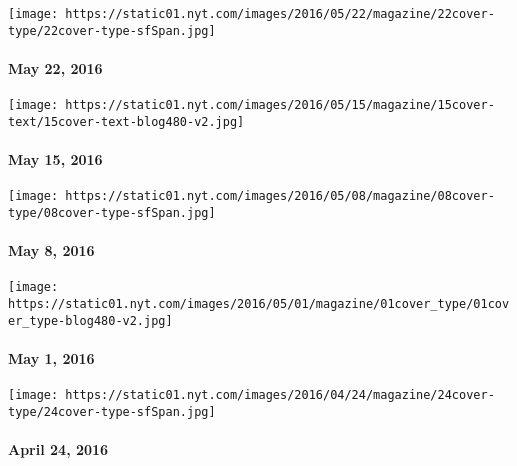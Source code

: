 \href{http://www.nytimes.com/indexes/2016/05/22/magazine/index.html}{}

\texttt{[image: https://static01.nyt.com/images/2016/05/22/magazine/22cover-type/22cover-type-sfSpan.jpg]}

\hypertarget{may-22-2016}{%
\paragraph{May 22, 2016}\label{may-22-2016}}

\href{http://www.nytimes.com/indexes/2016/05/15/magazine/index.html}{}

\texttt{[image: https://static01.nyt.com/images/2016/05/15/magazine/15cover-text/15cover-text-blog480-v2.jpg]}

\hypertarget{may-15-2016}{%
\paragraph{May 15, 2016}\label{may-15-2016}}

\href{http://www.nytimes.com/indexes/2016/05/05/magazine/index.html}{}

\texttt{[image: https://static01.nyt.com/images/2016/05/08/magazine/08cover-type/08cover-type-sfSpan.jpg]}

\hypertarget{may-8-2016}{%
\paragraph{May 8, 2016}\label{may-8-2016}}

\href{http://www.nytimes.com/indexes/2016/05/01/magazine/index.html}{}

\texttt{[image: https://static01.nyt.com/images/2016/05/01/magazine/01cover\_type/01cover\_type-blog480-v2.jpg]}

\hypertarget{may-1-2016}{%
\paragraph{May 1, 2016}\label{may-1-2016}}

\href{http://www.nytimes.com/indexes/2016/04/24/magazine/index.html}{}

\texttt{[image: https://static01.nyt.com/images/2016/04/24/magazine/24cover-type/24cover-type-sfSpan.jpg]}

\hypertarget{april-24-2016}{%
\paragraph{April 24, 2016}\label{april-24-2016}}

